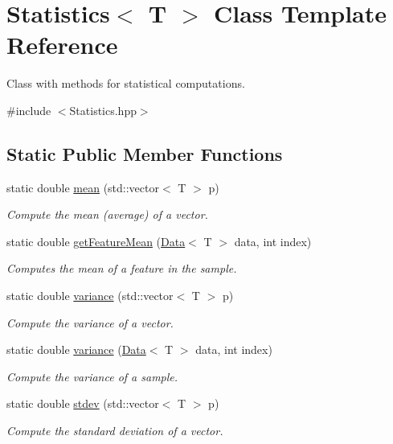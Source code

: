 \hypertarget{class_statistics}{}\section{Statistics$<$ T $>$ Class Template Reference}
\label{class_statistics}


Class with methods for statistical computations.  




{\ttfamily \#include $<$Statistics.\+hpp$>$}

\subsection*{Static Public Member Functions}
\begin{DoxyCompactItemize}
\item 
static double \hyperlink{class_statistics_a5c3639c37f312703cdebfe179a3c5180}{mean} (std\+::vector$<$ T $>$ p)
\begin{DoxyCompactList}\small\item\em Compute the mean (average) of a vector. \end{DoxyCompactList}\item 
static double \hyperlink{class_statistics_a0e62b9652ef3e3827daaed01c48faaa0}{get\+Feature\+Mean} (\hyperlink{class_data}{Data}$<$ T $>$ data, int index)
\begin{DoxyCompactList}\small\item\em Computes the mean of a feature in the sample. \end{DoxyCompactList}\item 
static double \hyperlink{class_statistics_a9e5a038712e910978ee5c6dd3c16d0ee}{variance} (std\+::vector$<$ T $>$ p)
\begin{DoxyCompactList}\small\item\em Compute the variance of a vector. \end{DoxyCompactList}\item 
static double \hyperlink{class_statistics_a02f605eec578754e63de82acce5a3f34}{variance} (\hyperlink{class_data}{Data}$<$ T $>$ data, int index)
\begin{DoxyCompactList}\small\item\em Compute the variance of a sample. \end{DoxyCompactList}\item 
static double \hyperlink{class_statistics_accf969226645d2fe2cb16ab24c3eeb33}{stdev} (std\+::vector$<$ T $>$ p)
\begin{DoxyCompactList}\small\item\em Compute the standard deviation of a vector. \end{DoxyCompactList}\item 

\end{DoxyCompactItemize}
